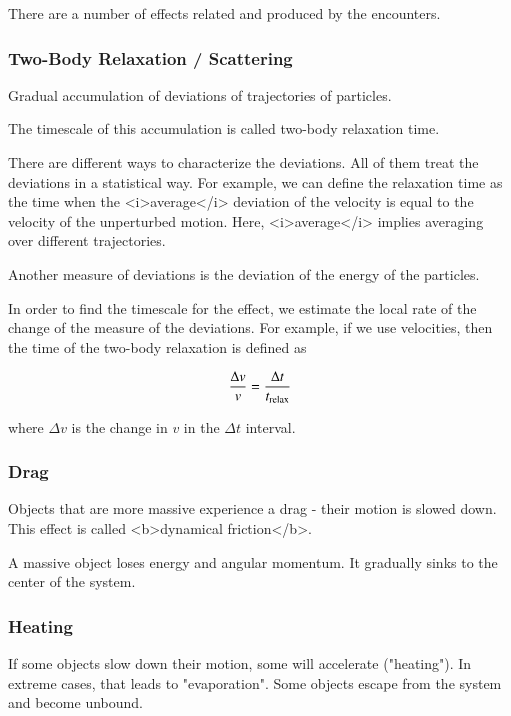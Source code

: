 There are a number of effects related and produced by the encounters. 

\subsubsection{Two-Body Relaxation / Scattering}

Gradual accumulation of deviations of trajectories of particles. 


The timescale of this accumulation is called two-body relaxation time. 

There are different ways to characterize the deviations. All of them treat the deviations in a statistical way. For example, we can define the relaxation time as the time when the <i>average</i> deviation of the velocity is equal to the velocity of the unperturbed motion. Here, <i>average</i> implies averaging over different trajectories. 

Another measure of deviations is the deviation of the energy of the particles. 

In order to find the timescale for the effect, we estimate the local rate of the change of the measure of the deviations. For example, if we use velocities, then the time of the two-body relaxation is defined 
as 

\begin{equation}
\frac{\Delta v}{v} = \frac{\Delta t}{t_{\rm relax}}
\end{equation}

where $\Delta v$ is the change in $v$ in the $\Delta t$ interval. 

\subsubsection{Drag}

Objects that are more massive experience a drag - their motion is slowed down. This effect is called <b>dynamical friction</b>. 


A massive object loses energy and angular momentum. It gradually sinks to the center of the system. 


\subsubsection{Heating}

If some objects slow down their motion, some will accelerate ("heating"). In extreme cases, that leads to "evaporation". Some objects escape from the system and become unbound. 

